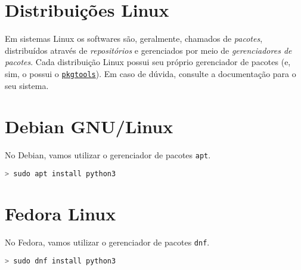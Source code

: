 \section{Distribuições Linux}\label{sec:distribuições-linux}

Em sistemas Linux os softwares são, geralmente, chamados de \textit{pacotes},
distribuídos através de \textit{repositórios} e gerenciados por meio de
\textit{gerenciadores de pacotes}. Cada distribuição Linux possui seu próprio
gerenciador de pacotes (e, sim, o \slackwarelinux{} possui o
\href{https://docs.slackware.com/slackware:package_management}{\texttt{pkgtools}}).
Em caso de dúvida, consulte a documentação para o seu sistema.

\section{Debian GNU/Linux}\label{ssec:debian-gnu/linux}

No Debian, vamos utilizar o gerenciador de pacotes \texttt{apt}.

\begin{lstlisting}[language=bash,caption={Instalando Python 3 no Debian},label={install-python3-debian}]
  > sudo apt install python3
\end{lstlisting}

\section{Fedora Linux}\label{ssec:fedora-linux}

No Fedora, vamos utilizar o gerenciador de pacotes \texttt{dnf}.

\begin{lstlisting}[language=bash,caption={Instalando Python 3 no Fedora}]
  > sudo dnf install python3
\end{lstlisting}
